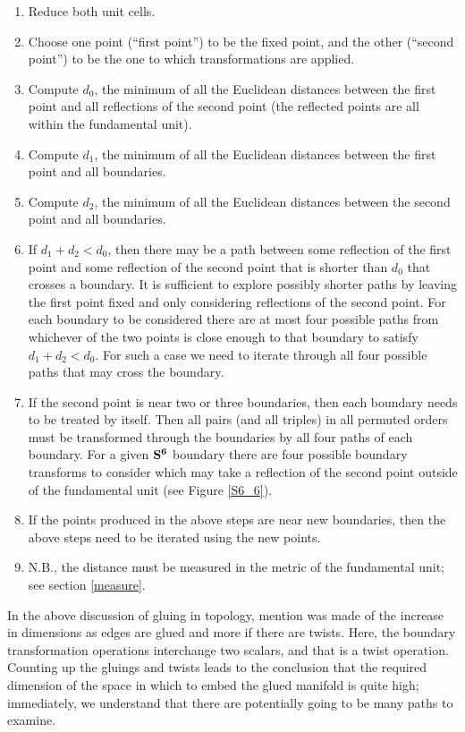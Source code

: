 \documentclass[preprint]{iucr}              %
\numberwithin{equation}{section}
\newcommand{\SVI}[0]{$\bf{S^{6}}$}
\begin{document}
\begin{enumerate}
	\item Reduce both unit cells.
	\item Choose one point (``first point'') to be the fixed point, and the other (``second point'') to be the one to which transformations are applied.
	\item Compute $d_0$, the minimum of all the Euclidean distances between the first point and all reflections of the second point (the reflected points are all within the fundamental unit).
	\item Compute $d_1$, the minimum of all the Euclidean distances between the first point and all boundaries.
	\item Compute $d_2$, the minimum of all the Euclidean distances between the second point and all boundaries.
	\item If $d_1+d_2 < d_0$, then there may be a path between
	some reflection of the first point and  some reflection of
	the second point that is shorter than $d_0$ that crosses a boundary.  It is sufficient to explore possibly shorter
	paths by leaving the
	first point fixed and only considering reflections of the
	second point.  For each boundary to be considered there are
	at most four possible paths from whichever of the two points
	is close enough to that boundary to satisfy $d_1+d_2 < d_0$.
	For such a case we need to iterate through all four possible paths that may cross the boundary.
	\item If the second point is near two or three boundaries, then each boundary needs to be treated by itself. Then all pairs (and all triples) in all permuted orders must be transformed through the boundaries by all four paths of each boundary.  For a given \SVI{} boundary there are four possible boundary transforms to consider which may take a reflection
	of the second point outside of the fundamental unit (see Figure \ref{S6_6}).
	\item If the points produced in the above steps are near new boundaries, then the above steps need to be iterated using the new points. 
	\item N.B., the distance must be measured in the metric
	of the fundamental unit; see section \ref{measure}.
\end{enumerate}

In the above discussion of gluing in topology, mention was made of the
increase in dimensions as edges are glued and more if there are twists.
Here, the boundary transformation operations interchange two scalars, and
that is a twist operation. Counting up the gluings and twists leads to
the conclusion that the required dimension of the space in which to embed the glued manifold is quite high; immediately,
we understand that there are potentially going to be many paths to examine.
\end{document}
